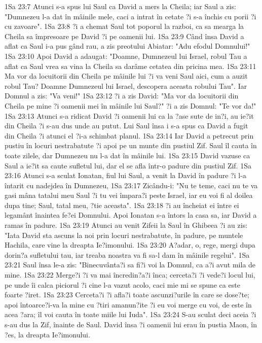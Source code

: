1Sa 23:7  Atunci s-a spus lui Saul ca David a mers la Cheila; iar Saul a zis: "Dumnezeu l-a dat în mâinile mele, caci a intrat în cetate ?i s-a închis cu porii ?i cu zavoare".
1Sa 23:8  ?i a chemat Saul tot poporul la razboi, ca sa mearga la Cheila sa împresoare pe David ?i pe oamenii lui.
1Sa 23:9  Când însa David a aflat ca Saul i-a pus gând rau, a zis preotului Abiatar: "Adu efodul Domnului!"
1Sa 23:10  Apoi David a adaugat: "Doamne, Dumnezeul lui Israel, robul Tau a aflat ca Saul vrea sa vina la Cheila sa darâme cetatea din pricina mea.
1Sa 23:11  Ma vor da locuitorii din Cheila pe mâinile lui ?i va veni Saul aici, cum a auzit robul Tau? Doamne Dumnezeul lui Israel, descopera aceasta robului Tau". Iar Domnul a zis: "Va veni!"
1Sa 23:12  ?i a zis David: "Ma vor da locuitorii din Cheila pe mine ?i oamenii mei în mâinile lui Saul?" ?i a zis Domnul: "Te vor da!"
1Sa 23:13  Atunci s-a ridicat David ?i oamenii lui ca la ?ase sute de in?i, au ie?it din Cheila ?i s-au dus unde au putut. Lui Saul însa i s-a spus ca David a fugit din Cheila ?i atunci el ?i-a schimbat planul.
1Sa 23:14  Iar David a petrecut prin pustiu în locuri nestrabatute ?i apoi pe un munte din pustiul Zif. Saul îl cauta în toate zilele, dar Dumnezeu nu l-a dat în mâinile lui.
1Sa 23:15  David vazuse ca Saul a ie?it sa caute sufletul lui, dar el se afla într-o padure din pustiul Zif.
1Sa 23:16  Atunci s-a sculat Ionatan, fiul lui Saul, a venit la David în padure ?i l-a întarit cu nadejdea în Dumnezeu,
1Sa 23:17  Zicându-i: "Nu te teme, caci nu te va gasi mâna tatalui meu Saul ?i tu vei împara?i peste Israel, iar eu voi fi al doilea dupa tine; Saul, tatal meu, ?tie aceasta".
1Sa 23:18  ?i au încheiat ei între ei legamânt înaintea fe?ei Domnului. Apoi Ionatan s-a întors la casa sa, iar David a ramas în padure.
1Sa 23:19  Atunci au venit Zifeii la Saul în Ghibeea ?i au zis: "Iata David sta ascuns la noi prin locuri nestrabatute, în padure, pe muntele Hachila, care vine la dreapta Ie?imonului.
1Sa 23:20  A?adar, o, rege, mergi dupa dorin?a sufletului tau, iar treaba noastra va fi sa-l dam în mâinile regelui".
1Sa 23:21  Saul însa le-a zis: "Binecuvânta?i sa fi?i voi la Domnul, ca a?i avut mila de mine.
1Sa 23:22  Merge?i ?i va mai încredin?a?i înca; cerceta?i ?i vede?i locul lui, pe unde îi calca piciorul ?i cine l-a vazut acolo, caci mie mi se spune ca este foarte ?iret.
1Sa 23:23  Cerceta?i ?i afla?i toate ascunzi?urile în care se dose?te; apoi întoarce?i-va la mine cu ?tiri amanun?ite ?i eu voi merge cu voi, de este în acea ?ara; îl voi cauta în toate miile lui Iuda".
1Sa 23:24  S-au sculat deci aceia ?i s-au dus la Zif, înainte de Saul. David însa ?i oamenii lui erau în pustia Maon, în ?es, la dreapta Ie?imonului.
